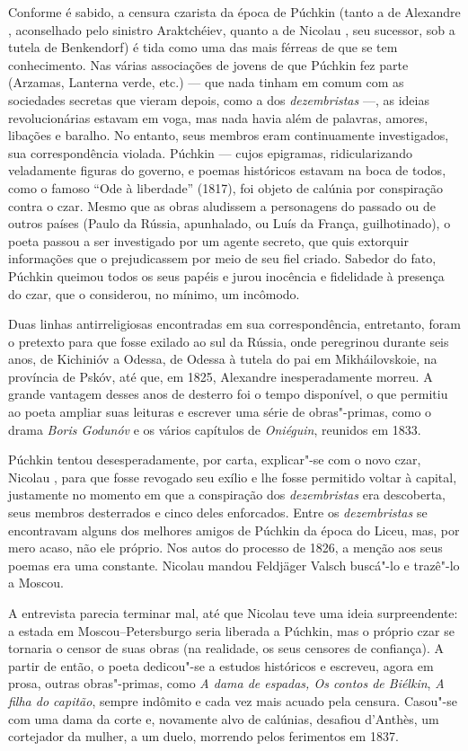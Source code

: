 Conforme é sabido, a censura czarista da época de Púchkin (tanto a de
Alexandre , aconselhado pelo sinistro Araktchéiev, quanto a de Nicolau , seu sucessor, sob a tutela de Benkendorf) é tida como uma das mais férreas de que se tem conhecimento. Nas várias associações de jovens de que Púchkin fez parte (Arzamas, Lanterna verde, etc.) --- que nada tinham em
comum com as sociedades secretas que vieram depois, como a dos \emph{dezembristas} ---, as ideias revolucionárias estavam em voga, mas nada havia além de palavras, amores, libações e baralho. No entanto, seus membros eram continuamente investigados, sua correspondência violada. Púchkin --- cujos epigramas, ridicularizando veladamente figuras do governo, e poemas históricos estavam na boca de todos, como o famoso ``Ode à liberdade'' (1817), foi objeto de calúnia por conspiração contra o czar. Mesmo que as obras aludissem a
personagens do passado ou de outros países (Paulo  da Rússia,
apunhalado, ou Luís  da França, guilhotinado), o poeta passou a ser investigado por um agente secreto, que quis extorquir informações que o
prejudicassem por meio de seu fiel criado. Sabedor do fato, Púchkin queimou todos os seus papéis e jurou inocência e fidelidade à presença do czar, que o considerou, no mínimo, um incômodo.

Duas linhas antirreligiosas encontradas em sua correspondência,
entretanto, foram o pretexto para que fosse exilado ao sul da Rússia,
onde peregrinou durante seis anos, de Kichinióv a
Odessa, de Odessa à tutela do pai em Mikháilovskoie, na província de
Pskóv, até que, em 1825, Alexandre  inesperadamente morreu. A grande
vantagem desses anos de desterro foi o tempo disponível, o que permitiu ao
poeta ampliar suas leituras e escrever uma série de obras"-primas, como o
drama \emph{Boris Godunóv} e os vários capítulos de
\emph{Oniéguin}, reunidos em 1833.

Púchkin tentou desesperadamente, por carta, explicar"-se com o novo czar,
Nicolau , para que fosse revogado seu exílio e lhe fosse permitido
voltar à capital, justamente no momento em que a conspiração dos \emph{dezembristas} era descoberta, seus membros desterrados e cinco deles enforcados. Entre os \emph{dezembristas} se encontravam alguns dos melhores amigos de Púchkin da época do Liceu, mas, por mero acaso, não ele próprio. Nos autos do processo de 1826, a
menção aos seus poemas era uma constante. Nicolau mandou Feldjäger Valsch buscá"-lo e trazê"-lo a Moscou.

A entrevista parecia terminar mal, até que Nicolau teve uma ideia
surpreendente: a estada em Moscou--Petersburgo seria liberada a Púchkin,
mas o próprio czar se tornaria o censor de suas obras (na realidade, os seus censores de confiança). A partir de então, o poeta dedicou"-se a
estudos históricos e escreveu, agora em prosa, outras obras"-primas,
como \emph{A dama de espadas, Os contos de Biélkin}, \emph{A filha do
capitão}, sempre indômito e cada vez mais acuado pela censura. Casou"-se com uma dama da corte e, novamente alvo de calúnias, desafiou d'Anthès, um cortejador da mulher, a um duelo, morrendo pelos ferimentos em 1837.



